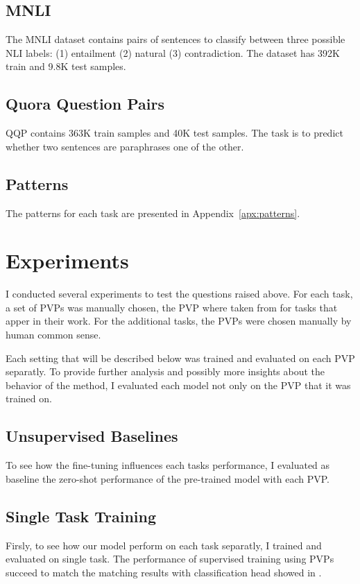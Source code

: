 \documentclass[11pt,a4paper]{article}
\begin{document}
\subsection{MNLI}
The MNLI dataset contains pairs of sentences to classify between three possible NLI labels: (1) entailment (2) natural (3) contradiction. 
The dataset has 392K train and 9.8K test samples. 

\subsection{Quora Question Pairs}
QQP contains 363K train samples and 40K test samples.
The task is to predict whether two sentences are paraphrases one of the other.

\subsection{Patterns}
The patterns for each task are presented in Appendix~\ref{apx:patterns}.


\section{Experiments}
\label{sec:experiments}

I conducted several experiments to test the questions raised above.
For each task, a set of PVPs was manually chosen, the PVP where taken from \citet{schick2020exploiting} for tasks that apper in their work.
For the additional tasks, the PVPs were chosen manually by human common sense. 

Each setting that will be described below was trained and evaluated on each PVP separatly.
To provide further analysis and possibly more insights about the behavior of the method, I evaluated each model not only on the PVP that it was trained on.

\subsection{Unsupervised Baselines}
To see how the fine-tuning influences each tasks performance, I evaluated as baseline the zero-shot performance of the pre-trained model with each PVP.

\subsection{Single Task Training}
Firsly, to see how our model perform on each task separatly, I trained and evaluated on single task.
The performance of supervised training using PVPs succeed to match the matching results with classification head showed in \citet{schick2020exploiting}.
\end{document}
